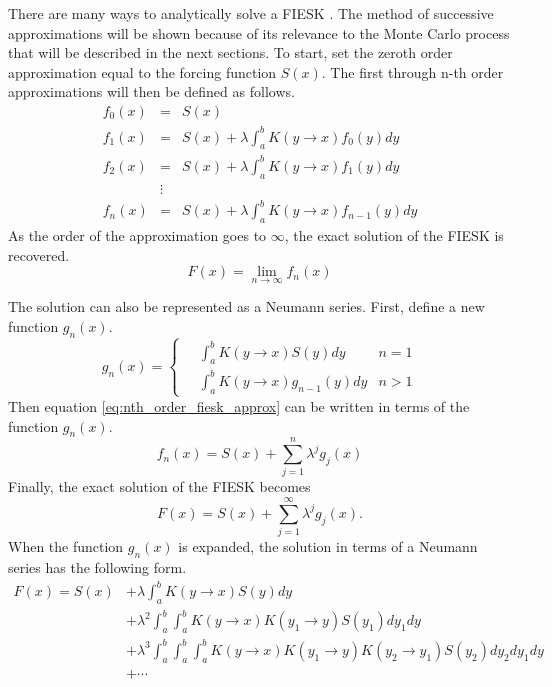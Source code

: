 There are many ways to analytically solve a FIESK 
\citep{rahman_integral_2007, morse_methods_1953}. The method of 
successive approximations will be shown because of its relevance to the
Monte Carlo process that will be described in the next sections. To start,
set the zeroth order approximation equal to the forcing function $S(x)$. The
first through n-th order approximations will then be defined as follows.
\begin{eqnarray}
  f_0(x) & = & S(x) \nonumber \\
  f_1(x) & = & S(x) + \lambda \int_a^b K(y \to x)f_0(y)dy \nonumber \\
  f_2(x) & = & S(x) + \lambda \int_a^b K(y \to x)f_1(y)dy \nonumber \\
  & \vdots & \nonumber \\
  f_n(x) & = & S(x) + \lambda \int_a^b K(y \to x)f_{n-1}(y)dy 
  \label{eq:nth_order_fiesk_approx} 
\end{eqnarray}
As the order of the approximation goes to $\infty$, the exact solution of
the FIESK is recovered.
\begin{equation}
  F(x) = \lim_{n \to \infty} f_n(x)
\end{equation}

The solution can also be represented as a Neumann series. First, define a new
function $g_n(x)$.
\begin{equation}
  g_n(x) = 
  \begin{cases}
    \quad \int_a^b K(y \to x) S(y)dy & n = 1 \\
    \quad \int_a^b K(y \to x) g_{n-1}(y)dy & n > 1 
  \end{cases}
\end{equation}
Then equation \ref{eq:nth_order_fiesk_approx} can be written in terms of the 
function $g_n(x)$.
\begin{equation}
  f_n(x) = S(x) + \sum_{j=1}^n \lambda^j g_j(x)
\end{equation}
Finally, the exact solution of the FIESK becomes
\begin{equation}
  F(x) = S(x) + \sum_{j=1}^{\infty} \lambda^j g_j(x).
\end{equation}
When the function $g_n(x)$ is expanded, the solution in terms of a Neumann 
series has the following form.
\begin{equation}
  \begin{split}
    F(x) = S(x) &+ \lambda \int_a^b K(y \to x)S(y)dy \\
    & + \lambda^2 \int_a^b \int_a^b K(y \to x)K(y_1 \to y)S(y_1)dy_1dy \\
    & + \lambda^3 \int_a^b \int_a^b \int_a^b K(y \to x)K(y_1 \to y)K(y_2 \to y_1)
    S(y_2)dy_2dy_1dy \\
    & + \cdots 
  \end{split}
  \label{eq:neumann_series_soln_expansion}
\end{equation}

